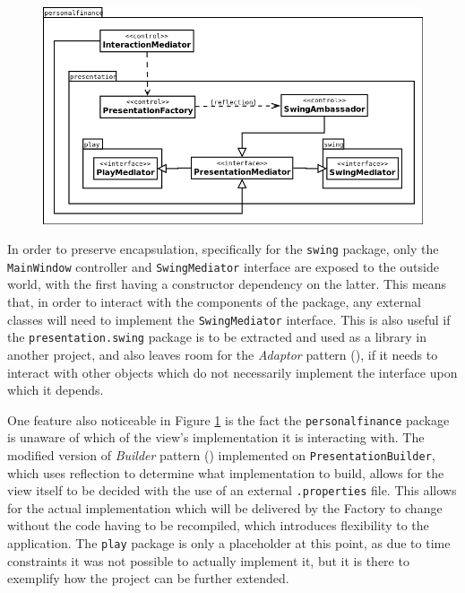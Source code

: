 \begin{figure}[ht!]
  \begin{center}
    \includegraphics[width=15cm]{contents/img/Package_Diagram_-_Presentation_MVC.png}
  \end{center}
  \caption{}
  \label{fig:PresentationMVC}
\end{figure}
\FloatBarrier


\begin{sloppypar}
  In order to preserve encapsulation, specifically for the \texttt{swing}
  package, only the \texttt{MainWindow} controller and \texttt{SwingMediator}
  interface are exposed to the outside world, with the first having a
  constructor dependency on the latter. This means that, in order to interact
  with the components of the package, any external classes will need to
  implement the \texttt{SwingMediator} interface. This is also useful if the
  \texttt{presentation.swing} package is to be extracted and used as a library
  in another project, and also leaves room for the \emph{Adaptor} pattern
  (\cite[][p.~139]{gamma1995design}), if it needs to interact with other
  objects which do not necessarily implement the interface upon which it
  depends.
\end{sloppypar}

One feature also noticeable in Figure \ref{fig:PresentationMVC} is the fact the
\texttt{personalfinance} package is unaware of which of the view's
implementation it is interacting with. The modified version of 
\emph{Builder} pattern (\cite[][pp.~37-38]{lokke2009scala}) implemented on
\texttt{PresentationBuilder}, which uses reflection to determine what
implementation to build, allows for the view itself to be decided with the use
of an external \texttt{.properties} file. This allows for the actual
implementation which will be delivered by the Factory to change without the
code having to be recompiled, which introduces flexibility to the application.
The \texttt{play} package is only a placeholder at this point, as due to time
constraints it was not possible to actually implement it, but it is there to
exemplify how the project can be further extended.

